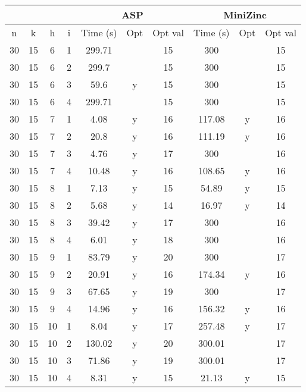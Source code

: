 \documentclass[12pt,a4paper,english,italian]{article}
\begin{document}
\begin{table}[]
	\begin{tabular}{cccc|ccc|ccc|}
		\cline{5-10}
		&    &    &   & \multicolumn{3}{c|}{ASP} & \multicolumn{3}{c|}{MiniZinc} \\ \hline
		n  & k  & h  & i & Time (s) & Opt & Opt val & Time (s)   & Opt   & Opt val  \\ \hline
		30 & 15 & 6  & 1 & 299.71   &     & 15      & 300        &       & 15       \\ \hline
		30 & 15 & 6  & 2 & 299.7    &     & 15      & 300        &       & 15       \\ \hline
		30 & 15 & 6  & 3 & 59.6     & y   & 15      & 300        &       & 15       \\ \hline
		30 & 15 & 6  & 4 & 299.71   &     & 15      & 300        &       & 15       \\ \hline
		30 & 15 & 7  & 1 & 4.08     & y   & 16      & 117.08     & y     & 16       \\ \hline
		30 & 15 & 7  & 2 & 20.8     & y   & 16      & 111.19     & y     & 16       \\ \hline
		30 & 15 & 7  & 3 & 4.76     & y   & 17      & 300        &       & 16       \\ \hline
		30 & 15 & 7  & 4 & 10.48    & y   & 16      & 108.65     & y     & 16       \\ \hline
		30 & 15 & 8  & 1 & 7.13     & y   & 15      & 54.89      & y     & 15       \\ \hline
		30 & 15 & 8  & 2 & 5.68     & y   & 14      & 16.97      & y     & 14       \\ \hline
		30 & 15 & 8  & 3 & 39.42    & y   & 17      & 300        &       & 16       \\ \hline
		30 & 15 & 8  & 4 & 6.01     & y   & 18      & 300        &       & 16       \\ \hline
		30 & 15 & 9  & 1 & 83.79    & y   & 20      & 300        &       & 17       \\ \hline
		30 & 15 & 9  & 2 & 20.91    & y   & 16      & 174.34     & y     & 16       \\ \hline
		30 & 15 & 9  & 3 & 67.65    & y   & 19      & 300        &       & 17       \\ \hline
		30 & 15 & 9  & 4 & 14.96    & y   & 16      & 156.32     & y     & 16       \\ \hline
		30 & 15 & 10 & 1 & 8.04     & y   & 17      & 257.48     & y     & 17       \\ \hline
		30 & 15 & 10 & 2 & 130.02   & y   & 20      & 300.01     &       & 17       \\ \hline
		30 & 15 & 10 & 3 & 71.86    & y   & 19      & 300.01     &       & 17       \\ \hline
		30 & 15 & 10 & 4 & 8.31     & y   & 15      & 21.13      & y     & 15       \\ \hline
	\end{tabular}
\end{table}
\end{document}
